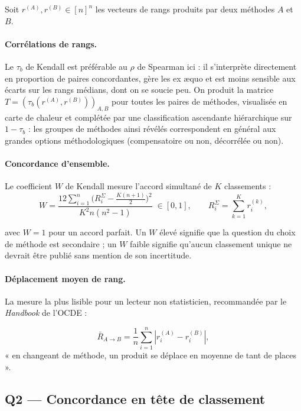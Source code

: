 \documentclass[11pt,a4paper]{article}
\theoremstyle{definition}
\theoremstyle{remark}
\newcommand{\abs}[1]{\left\lvert #1 \right\rvert}
\begin{document}
Soit $r^{(A)}, r^{(B)} \in [n]^n$ les vecteurs de rangs produits par deux méthodes $A$ et $B$.

\paragraph{Corrélations de rangs.} Le $\tau_b$ de Kendall est préférable au $\rho$ de Spearman
ici : il s'interprète directement en proportion de paires concordantes, gère les ex \ae quo et est
moins sensible aux écarts sur les rangs médians, dont on se soucie peu. On produit la matrice
$T = (\tau_b(r^{(A)}, r^{(B)}))_{A,B}$ pour toutes les paires de méthodes, visualisée en carte de
chaleur et complétée par une classification ascendante hiérarchique sur $1-\tau_b$ : les groupes
de méthodes ainsi révélés correspondent en général aux grandes options méthodologiques
(compensatoire ou non, décorrélée ou non).

\bigskip

\paragraph{Concordance d'ensemble.} Le coefficient $W$ de Kendall mesure l'accord simultané de
$K$ classements :
\[
W = \frac{12 \sum_{i=1}^n \big(R^{\Sigma}_i - \tfrac{K(n+1)}{2}\big)^2}{K^2 n (n^2-1)}
\;\in [0,1],
\qquad R^{\Sigma}_i = \sum_{k=1}^K r^{(k)}_i,
\]

\bigskip

avec $W = 1$ pour un accord parfait. Un $W$ élevé signifie que la question du choix de méthode est
secondaire ; un $W$ faible signifie qu'aucun classement unique ne devrait être publié sans
mention de son incertitude.

\bigskip

\paragraph{Déplacement moyen de rang.} La mesure la plus lisible pour un lecteur non
statisticien, recommandée par le \emph{Handbook} de l'OCDE :

\medskip

\[
\bar{R}_{A\to B} = \frac{1}{n}\sum_{i=1}^n \abs{r^{(A)}_i - r^{(B)}_i},
\]
« en changeant de méthode, un produit se déplace en moyenne de tant de places ».

\bigskip

\subsection{Q2 --- Concordance en tête de classement}
\end{document}
